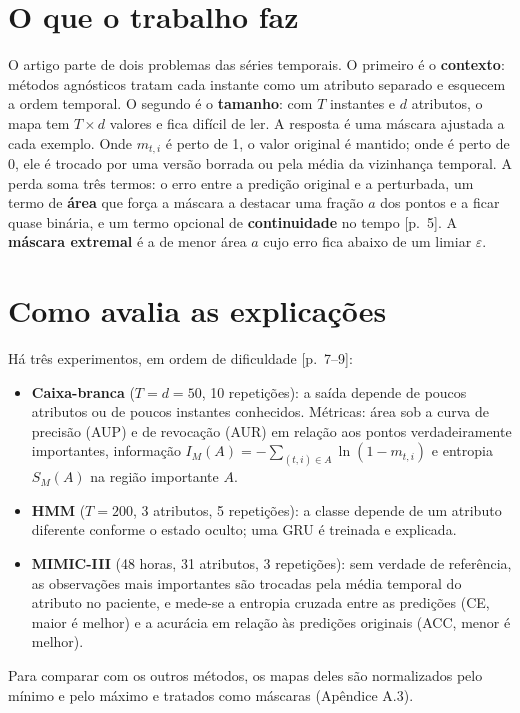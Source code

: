 \documentclass[11pt,a4paper]{article}
\begin{document}
\section{O que o trabalho faz}
O artigo parte de dois problemas das séries temporais. O primeiro é o \textbf{contexto}: métodos agnósticos tratam cada instante como um atributo separado e esquecem a ordem temporal. O segundo é o \textbf{tamanho}: com $T$ instantes e $d$ atributos, o mapa tem $T \times d$ valores e fica difícil de ler. A resposta é uma máscara ajustada a cada exemplo. Onde $m_{t,i}$ é perto de 1, o valor original é mantido; onde é perto de 0, ele é trocado por uma versão borrada ou pela média da vizinhança temporal. A perda soma três termos: o erro entre a predição original e a perturbada, um termo de \textbf{área} que força a máscara a destacar uma fração $a$ dos pontos e a ficar quase binária, e um termo opcional de \textbf{continuidade} no tempo [p.~5]. A \textbf{máscara extremal} é a de menor área $a$ cujo erro fica abaixo de um limiar $\varepsilon$.

\section{Como avalia as explicações}
Há três experimentos, em ordem de dificuldade [p.~7--9]:
\begin{itemize}
\item \textbf{Caixa-branca} ($T = d = 50$, 10 repetições): a saída depende de poucos atributos ou de poucos instantes conhecidos. Métricas: área sob a curva de precisão (AUP) e de revocação (AUR) em relação aos pontos verdadeiramente importantes, informação $I_M(A) = -\sum_{(t,i)\in A} \ln(1 - m_{t,i})$ e entropia $S_M(A)$ na região importante $A$.
\item \textbf{HMM} ($T = 200$, 3 atributos, 5 repetições): a classe depende de um atributo diferente conforme o estado oculto; uma GRU é treinada e explicada.
\item \textbf{MIMIC-III} (48 horas, 31 atributos, 3 repetições): sem verdade de referência, as observações mais importantes são trocadas pela média temporal do atributo no paciente, e mede-se a entropia cruzada entre as predições (CE, maior é melhor) e a acurácia em relação às predições originais (ACC, menor é melhor).
\end{itemize}
Para comparar com os outros métodos, os mapas deles são normalizados pelo mínimo e pelo máximo e tratados como máscaras (Apêndice A.3).
\end{document}
